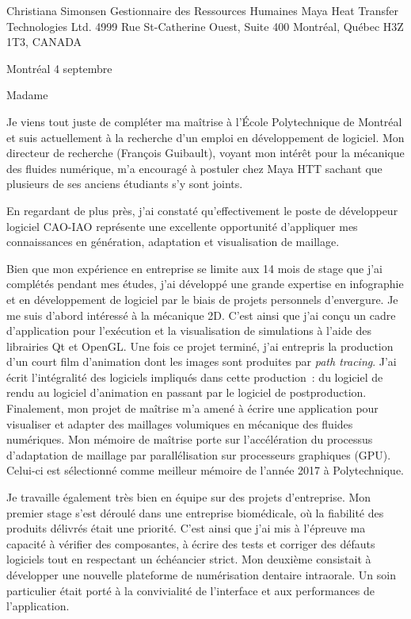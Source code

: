 \insertcvheader
\clrecipient
 {Christiana Simonsen}
 {Gestionnaire des Ressources Humaines}
 {Maya Heat Transfer Technologies Ltd.}
 {4999 Rue St-Catherine Ouest, Suite 400}
 {Montréal, Québec H3Z 1T3, CANADA}
 
\cllocationdate
 {Montréal}
 {4 septembre}
 
\clgreeting
 {Madame}
 
Je viens tout juste de compléter ma maîtrise à l’École Polytechnique de Montréal et suis actuellement à la recherche d’un emploi en développement de logiciel. Mon directeur de recherche (François Guibault), voyant mon intérêt pour la mécanique des fluides numérique, m’a encouragé à postuler chez Maya HTT sachant que plusieurs de ses anciens étudiants s’y sont joints.

En regardant de plus près, j’ai constaté qu’effectivement le poste de développeur logiciel CAO-IAO représente une excellente opportunité d’appliquer mes connaissances en génération, adaptation et visualisation de maillage. 
 
Bien que mon expérience en entreprise se limite aux 14 mois de stage que j’ai complétés pendant mes études, j’ai développé une grande expertise en infographie et en développement de logiciel par le biais de projets personnels d’envergure. Je me suis d’abord intéressé à la mécanique 2D. C’est ainsi que j’ai conçu un cadre d’application pour l’exécution et la visualisation de simulations à l’aide des librairies Qt et OpenGL. Une fois ce projet terminé, j’ai entrepris la production d’un court film d’animation dont les images sont produites par \textit{path tracing}. J’ai écrit l’intégralité des logiciels impliqués dans cette production~: du logiciel de rendu au logiciel d’animation en passant par le logiciel de postproduction. Finalement, mon projet de maîtrise m’a amené à écrire une application pour visualiser et adapter des maillages volumiques en mécanique des fluides numériques. Mon mémoire de maîtrise porte sur l’accélération du processus d’adaptation de maillage par parallélisation sur processeurs graphiques (GPU). Celui-ci est sélectionné comme meilleur mémoire de l’année 2017 à Polytechnique.

Je travaille également très bien en équipe sur des projets d’entreprise. Mon premier stage s’est déroulé dans une entreprise biomédicale, où la fiabilité des produits délivrés était une priorité. C’est ainsi que j’ai mis à l’épreuve ma capacité à vérifier des composantes, à écrire des tests et corriger des défauts logiciels tout en respectant un échéancier strict. Mon deuxième consistait à développer une nouvelle plateforme de numérisation dentaire intraorale. Un soin particulier était porté à la convivialité de l’interface et aux performances de l’application.


